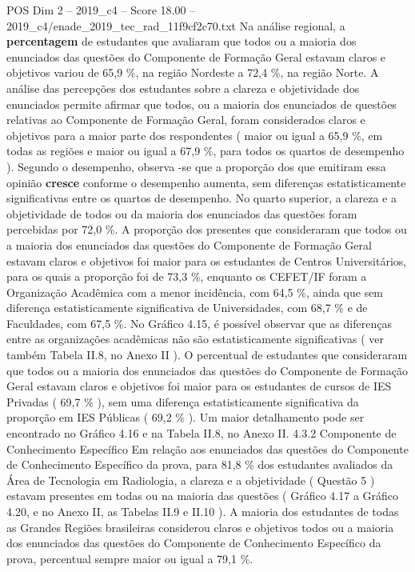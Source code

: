 \begin{textsample}{POS Dim 2 – 2019\_c4 – Score 18.00 – 2019\_c4/enade\_2019\_tec\_rad\_11f9cf2c70.txt}
Na análise regional, a \textbf{percentagem} de estudantes que avaliaram que todos ou a maioria dos enunciados das questões do Componente de Formação Geral estavam claros e objetivos variou de 65,9 \%, na região Nordeste a 72,4 \%, na região Norte.
A análise das percepções dos estudantes sobre a clareza e objetividade dos enunciados permite afirmar que todos, ou a maioria dos enunciados de questões relativas ao Componente de Formação Geral, foram considerados claros e objetivos para a maior parte dos respondentes ( maior ou igual a 65,9 \%, em todas as regiões e maior ou igual a 67,9 \%, para todos os quartos de desempenho ).
Segundo o desempenho, observa -se que a proporção dos que emitiram essa opinião \textbf{cresce} conforme o desempenho aumenta, sem diferenças estatisticamente significativas entre os quartos de desempenho.
No quarto superior, a clareza e a objetividade de todos ou da maioria dos enunciados das questões foram percebidas por 72,0 \%.
A proporção dos presentes que consideraram que todos ou a maioria dos enunciados das questões do Componente de Formação Geral estavam claros e objetivos foi maior para os estudantes de Centros Universitários, para os quais a proporção foi de 73,3 \%, enquanto os CEFET/IF foram a Organização Acadêmica com a menor incidência, com 64,5 \%, ainda que sem diferença estatisticamente significativa de Universidades, com 68,7 \% e de Faculdades, com 67,5 \%.
No Gráfico 4.15, é possível observar que as diferenças entre as organizações acadêmicas não são estatisticamente significativas ( ver também Tabela II.8, no Anexo II ).
O percentual de estudantes que consideraram que todos ou a maioria dos enunciados das questões do Componente de Formação Geral estavam claros e objetivos foi maior para os estudantes de cursos de IES Privadas ( 69,7 \% ), sem uma diferença estatisticamente significativa da proporção em IES Públicas ( 69,2 \% ).
Um maior detalhamento pode ser encontrado no Gráfico 4.16 e na Tabela II.8, no Anexo II. 4.3.2 Componente de Conhecimento Específico Em relação aos enunciados das questões do Componente de Conhecimento Específico da prova, para 81,8 \% dos estudantes avaliados da Área de Tecnologia em Radiologia, a clareza e a objetividade ( Questão 5 ) estavam presentes em todas ou na maioria das questões ( Gráfico 4.17 a Gráfico 4.20, e no Anexo II, as Tabelas II.9 e II.10 ).
A maioria dos estudantes de todas as Grandes Regiões brasileiras considerou claros e objetivos todos ou a maioria dos enunciados das questões do Componente de Conhecimento Específico da prova, percentual sempre maior ou igual a 79,1 \%.

\end{textsample}

